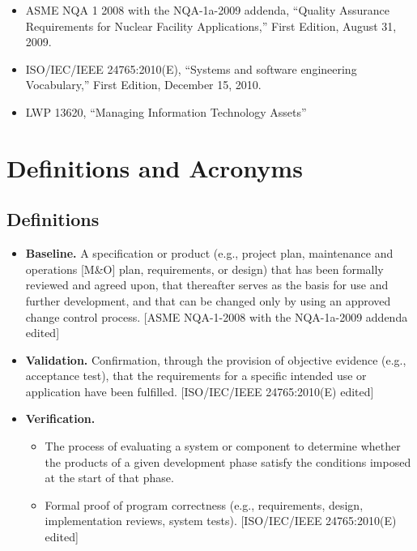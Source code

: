 \begin{itemize}

  \item ASME NQA 1 2008 with the NQA-1a-2009 addenda, ``Quality Assurance Requirements for Nuclear Facility Applications,'' First Edition, August 31, 2009.
  \item ISO/IEC/IEEE 24765:2010(E), ``Systems and software engineering Vocabulary,'' First Edition, December 15, 2010.
  \item LWP 13620, ``Managing Information Technology Assets''
\end{itemize}


\section{Definitions and Acronyms}

\subsection{Definitions}
\begin{itemize}
  \item \textbf{Baseline.} A specification or product (e.g., project plan, maintenance and operations [M\&O] plan, requirements, or 
design) that has been formally reviewed and agreed upon, that thereafter serves as the basis for use and further 
development, and that can be changed only by using an approved change control process. [ASME NQA-1-2008 with the 
NQA-1a-2009 addenda edited]
  \item \textbf{Validation.} Confirmation, through the provision of objective evidence (e.g., acceptance test), that the requirements 
for a specific intended use or application have been fulfilled. [ISO/IEC/IEEE 24765:2010(E) edited]
  \item \textbf{Verification.}
  \begin{itemize}
     \item The process of evaluating a system or component to determine whether the products of a given development 
     phase satisfy the conditions imposed at the start of that phase.
     \item  Formal proof of program correctness (e.g., requirements, design, implementation reviews, system tests). 
     [ISO/IEC/IEEE 24765:2010(E) edited]
  \end{itemize}
\end{itemize}

